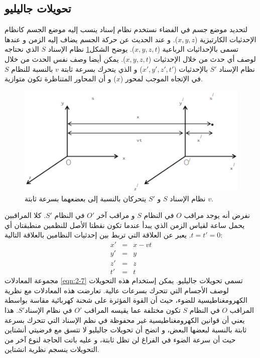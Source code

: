 \subsection{تحويلات جاليليو}
لتحديد موضع جسم في الفضاء نستخدم نظام إسناد ينسب إليه موضع الجسم كانظام الإحدثيات الكارتيزية ($x, y, z$). و عند الحديث عن حركة الجسم يضاف إليه الزمن و عندها تسمى بالإحداثيات الرباعية ($x, y, z, t$). يوضح الشكل\ref{fig:-2_3} نظام الإسناد $S$ الذي نحتاجه لوصف أي حدث من خلال الإحدثيات ($x, y, z, t$). يمكن أيضا وصف نفس الحدث من خلال نظام الإسناد $S'$ بالإحدثيات ($x', y', z', t'$) و الذي يتحرك بسرعة ثابتة $v$ بالنسبة للنظام $S$ في الإتجاه الموجب لمحور ($x$) و أن المحاور المتناظرة تكون متوازية.
\begin{figure}[h!]
	\centering
	\includegraphics[width=0.6\linewidth, height=0.2\textheight]{"Fig/Fig_II/الشكل 2_3"}
	\caption{نظام الإسناد $S$ و $S'$ يتحركان بالنسبة إلى بعضعهما بسرعة ثابتة $v$.}
	\label{fig:-2_3}
\end{figure}
نفرض أنه يوجد مراقب $O$ في النظام $S$ و مراقب آخر $O'$ في النظام $S'$. كلا المراقبين يحمل ساعة لقياس الزمن الذي يبدأ عندما تكون نقطتا اﻷصل للنظمين منطبقتان أي $t=t'=0$. 
يعبر عن العلاقة التي تربط بين إحدثيات النظامين بالعلاقة التالية:
\begin{equation}
	\label{eqn:2-7}
	\begin{array}{ccl}
		x' & = &  x -vt \\
		y' & = & y \\
		z' & = & z \\
		t' & = & t
	\end{array}
\end{equation}
مجموعة المعادلات \eqref{eqn:2-7} تسمى تحويلات جاليليو. يمكن إستخدام هذه التحويلات لوصف اﻷجسام التي تتحرك بسرعات عالية. تعارضت هذه المعادلات مع نظرية الكهرومغناطيسية للضوء، حيث أن القوة المؤثرة على شحنة كهربائية مقاسة بواسطة المراقب $O$ في النظام $S$ تكون مختلفة عما يقيسه المراقب $O'$ في نظام الإسناد$S'$. هذا يعني أن قوانين الكهرومغناطيسية غير محفوظة في نظم الإسناد التي تتحرك بسرعة ثابتة بالنسبة لبعضها البعض، و اتضح أن تحويلات جاليليو لا تتسق مع فرضيتي أنشتاين حيث أن سرعة الضوء في الفراغ لن تظل ثابتة، و عليه باتت الحاجة لنوع آخر من التحويلات ينسجم نظرية انشتاين.
